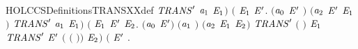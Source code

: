 \begin{SaveVerbatim}{HOLCCSDefinitionsTRANSXXdef}
                      \ensuremath{\HOLBoundVar{TRANS}\sp{\prime}}  \ensuremath{\HOLBoundVar{a}\sb{\mathrm{1}}} \ensuremath{\HOLBoundVar{E}\sb{\mathrm{1}}}\ensuremath{)} \HOLSymConst{\HOLTokenDisj{}}
                 \ensuremath{(}\HOLSymConst{\HOLTokenExists{}} \ensuremath{\HOLBoundVar{E}\sb{\mathrm{1}}} \ensuremath{\HOLBoundVar{E}\sp{\prime}}.
                      \ensuremath{(}\ensuremath{\HOLBoundVar{a}\sb{\mathrm{0}}} \HOLSymConst{\ensuremath{=}} \ensuremath{\HOLBoundVar{E}\sp{\prime}} \HOLSymConst{\ensuremath{\mid}} \ensuremath{)} \HOLSymConst{\HOLTokenConj{}} \ensuremath{(}\ensuremath{\HOLBoundVar{a}\sb{\mathrm{2}}} \HOLSymConst{\ensuremath{=}} \ensuremath{\HOLBoundVar{E}\sp{\prime}} \HOLSymConst{\ensuremath{\mid}} \ensuremath{\HOLBoundVar{E}\sb{\mathrm{1}}}\ensuremath{)} \HOLSymConst{\HOLTokenConj{}}
                      \ensuremath{\HOLBoundVar{TRANS}\sp{\prime}}  \ensuremath{\HOLBoundVar{a}\sb{\mathrm{1}}} \ensuremath{\HOLBoundVar{E}\sb{\mathrm{1}}}\ensuremath{)} \HOLSymConst{\HOLTokenDisj{}}
                 \ensuremath{(}\HOLSymConst{\HOLTokenExists{}}  \ensuremath{\HOLBoundVar{E}\sb{\mathrm{1}}} \ensuremath{\HOLBoundVar{E}\sp{\prime}} \ensuremath{\HOLBoundVar{E}\sb{\mathrm{2}}}.
                      \ensuremath{(}\ensuremath{\HOLBoundVar{a}\sb{\mathrm{0}}} \HOLSymConst{\ensuremath{=}}  \HOLSymConst{\ensuremath{\mid}} \ensuremath{\HOLBoundVar{E}\sp{\prime}}\ensuremath{)} \HOLSymConst{\HOLTokenConj{}} \ensuremath{(}\ensuremath{\HOLBoundVar{a}\sb{\mathrm{1}}} \HOLSymConst{\ensuremath{=}} \HOLConst{\ensuremath{\tau}}\ensuremath{)} \HOLSymConst{\HOLTokenConj{}}
                      \ensuremath{(}\ensuremath{\HOLBoundVar{a}\sb{\mathrm{2}}} \HOLSymConst{\ensuremath{=}} \ensuremath{\HOLBoundVar{E}\sb{\mathrm{1}}} \HOLSymConst{\ensuremath{\mid}} \ensuremath{\HOLBoundVar{E}\sb{\mathrm{2}}}\ensuremath{)} \HOLSymConst{\HOLTokenConj{}} \ensuremath{\HOLBoundVar{TRANS}\sp{\prime}}  \ensuremath{(} \ensuremath{)} \ensuremath{\HOLBoundVar{E}\sb{\mathrm{1}}} \HOLSymConst{\HOLTokenConj{}}
                      \ensuremath{\HOLBoundVar{TRANS}\sp{\prime}} \ensuremath{\HOLBoundVar{E}\sp{\prime}} \ensuremath{(} \ensuremath{(} \ensuremath{)}\ensuremath{)} \ensuremath{\HOLBoundVar{E}\sb{\mathrm{2}}}\ensuremath{)} \HOLSymConst{\HOLTokenDisj{}}
                 \ensuremath{(}\HOLSymConst{\HOLTokenExists{}} \ensuremath{\HOLBoundVar{E}\sp{\prime}}  .

\end{SaveVerbatim}
